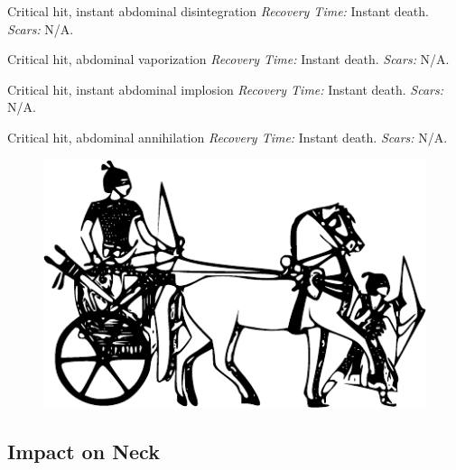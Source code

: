 \documentclass[12pt]{book}  %
\begin{document}
\begin{description}[labelwidth=1.5em, leftmargin=*, itemsep=0.4em]
    \item[17 -] Critical hit, instant abdominal disintegration \textit{Recovery Time:} Instant death. \textit{Scars:} N/A.
    \item[18 -] Critical hit, abdominal vaporization \textit{Recovery Time:} Instant death. \textit{Scars:} N/A.
    \item[19 -] Critical hit, instant abdominal implosion \textit{Recovery Time:} Instant death. \textit{Scars:} N/A.
    \item[20 -] Critical hit, abdominal annihilation \textit{Recovery Time:} Instant death. \textit{Scars:} N/A.
\end{description}

\begin{figure}[h]
    \centering
    \includegraphics[width=\textwidth]{./images/combat14.pdf}
\end{figure}

\subsection{Impact on Neck}
\end{document}
